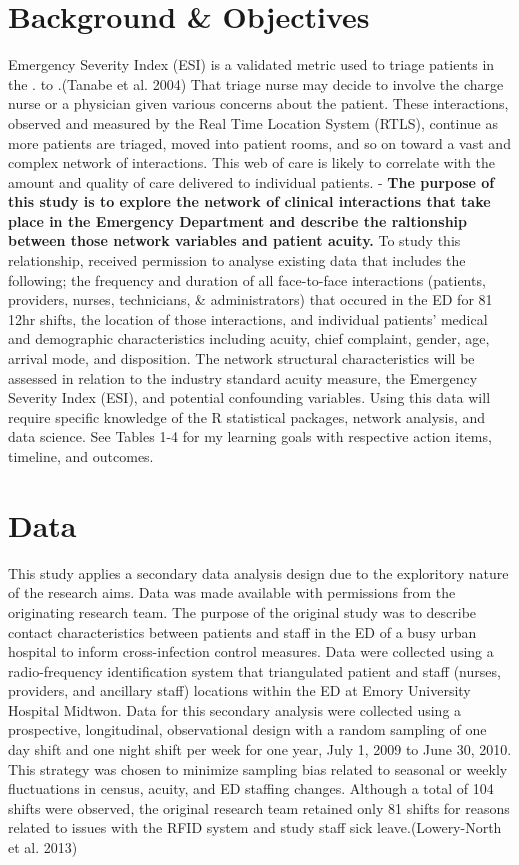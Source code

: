 \documentclass[]{elsarticle} %
\begin{document}
\section{Background \& Objectives}\label{background-objectives}

Emergency Severity Index (ESI) is a validated metric used to triage
patients in the . to .(Tanabe et al. 2004) That triage nurse may decide
to involve the charge nurse or a physician given various concerns about
the patient. These interactions, observed and measured by the Real Time
Location System (RTLS), continue as more patients are triaged, moved
into patient rooms, and so on toward a vast and complex network of
interactions. This web of care is likely to correlate with the amount
and quality of care delivered to individual patients. - \textbf{The
purpose of this study is to explore the network of clinical interactions
that take place in the Emergency Department and describe the raltionship
between those network variables and patient acuity.} To study this
relationship, received permission to analyse existing data that includes
the following; the frequency and duration of all face-to-face
interactions (patients, providers, nurses, technicians, \&
administrators) that occured in the ED for 81 12hr shifts, the location
of those interactions, and individual patients' medical and demographic
characteristics including acuity, chief complaint, gender, age, arrival
mode, and disposition. The network structural characteristics will be
assessed in relation to the industry standard acuity measure, the
Emergency Severity Index (ESI), and potential confounding variables.
Using this data will require specific knowledge of the R statistical
packages, network analysis, and data science. See Tables 1-4 for my
learning goals with respective action items, timeline, and outcomes.

\section{Data}\label{data}

This study applies a secondary data analysis design due to the
exploritory nature of the research aims. Data was made available with
permissions from the originating research team. The purpose of the
original study was to describe contact characteristics between patients
and staff in the ED of a busy urban hospital to inform cross-infection
control measures. Data were collected using a radio-frequency
identification system that triangulated patient and staff (nurses,
providers, and ancillary staff) locations within the ED at Emory
University Hospital Midtwon. Data for this secondary analysis were
collected using a prospective, longitudinal, observational design with a
random sampling of one day shift and one night shift per week for one
year, July 1, 2009 to June 30, 2010. This strategy was chosen to
minimize sampling bias related to seasonal or weekly fluctuations in
census, acuity, and ED staffing changes. Although a total of 104 shifts
were observed, the original research team retained only 81 shifts for
reasons related to issues with the RFID system and study staff sick
leave.(Lowery-North et al. 2013)
\end{document}
